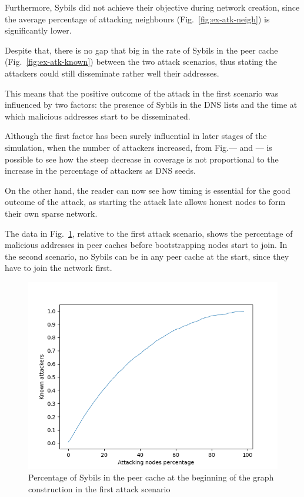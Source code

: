 Furthermore, Sybils did not achieve their objective during network creation, since the average percentage of attacking neighbours (Fig.~\ref{fig:ex-atk-neigh}) is significantly lower.

Despite that, there is no gap that big in the rate of Sybils in the peer cache (Fig.~\ref{fig:ex-atk-known}) between the two attack scenarios, thus stating the attackers could still disseminate rather well their addresses.

This means that the positive outcome of the attack in the first scenario was influenced by two factors: the presence of Sybils in the DNS lists and the time at which malicious addresses start to be disseminated.

Although the first factor has been surely influential in later stages of the simulation, when the number of attackers increased, from Fig.--- and --- is possible to see how the steep decrease in coverage is not proportional to the increase in the percentage of attackers as DNS seeds.

On the other hand, the reader can now see how timing is essential for the good outcome of the attack, as starting the attack late allows honest nodes to form their own sparse network.

The data in Fig.~\ref{fig:beginning}, relative to the first attack scenario, shows the percentage of malicious addresses in peer caches before bootstrapping nodes start to join. In the second scenario, no Sybils can be in any peer cache at the start, since they have to join the network first.\par

\begin{figure}[h!]
	\includegraphics[width=.7\textwidth]{pict/results/in-atkknown-beginning.png}
	\centering
	\caption{Percentage of Sybils in the peer cache at the beginning of the graph construction in the first attack scenario}
	\label{fig:beginning}
\end{figure}


